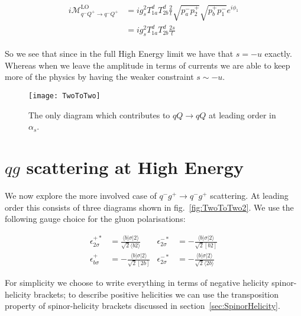 		\begin{align}
		\begin{split}
			i\mathcal{M}_{q^-Q^+\rightarrow q^-Q^+}^{\text{LO}} &=
			ig_s^2T^d_{1a}T^d_{2b}\frac{2}{t}\sqrt{p_a^-p_2^+}\sqrt{p_b^+p_1^-}e^{i\phi_1}\\
			&=ig_s^2T^d_{1a}T^d_{2b}\frac{2s}{t}
		\end{split}
		\end{align}

		So we see that since in the full High Energy limit we have that $s=-u$
		exactly.  Whereas when we leave the amplitude in terms of currents we are able to keep
		more of the physics by having the weaker constraint $s\sim-u$.

		\begin{figure}
			\begin{center}
			\texttt{[image: TwoToTwo]}
			\caption{The only diagram which contributes to $qQ\rightarrow qQ$ at leading order in $\alpha_s$.}
			\label{fig:TwoToTwo}
			\end{center}
		\end{figure}

	\section{$qg$ scattering at High Energy}

		We now explore the more involved case of $q^-g^+\to q^-g^+$ scattering.  At leading order this
		consists of three diagrams shown in fig.~\eqref{fig:TwoToTwo2}.  We use the following gauge
		choice for the gluon polarisations:

		\begin{align}
		\epsilon^{+*}_{2\sigma}&=\frac{\langle b|\sigma|2\rangle}{\sqrt{2}\langle b2\rangle}
		& \epsilon^{-*}_{2\sigma} &= -\frac{\langle b|\sigma|2\rangle}{\sqrt{2}[b2]} \\
		\epsilon^{+}_{b\sigma}&=-\frac{\langle b|\sigma|2\rangle}{\sqrt{2}[2b]}
		& \epsilon^{-*}_{2\sigma} &= -\frac{\langle b|\sigma|2\rangle}{\sqrt{2}\langle 2b\rangle}
		\end{align}

		For simplicity we choose to write everything in terms of negative helicity spinor-helicity brackets;
		to describe positive helicities we can use the transposition property of spinor-helicity brackets discussed
		in section~\ref{sec:SpinorHelicity}.

